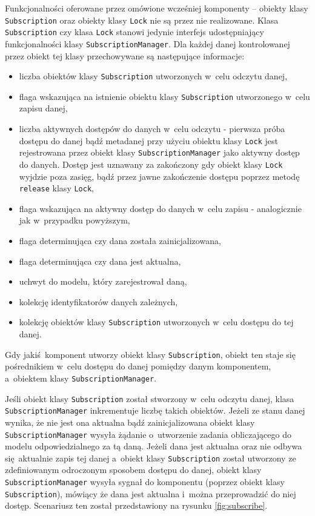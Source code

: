 Funkcjonalności oferowane przez omówione wcześniej komponenty -- obiekty klasy \lstinline$Subscription$ oraz obiekty klasy \lstinline$Lock$ nie są przez nie realizowane. Klasa \lstinline$Subscription$ czy klasa \lstinline$Lock$ stanowi jedynie interfejs udostępniający funkcjonalności klasy \lstinline$SubscriptionManager$. Dla każdej danej kontrolowanej przez obiekt tej klasy przechowywane są następujące informacje:
\begin{itemize}
	\item liczba obiektów klasy \lstinline$Subscription$ utworzonych w~celu odczytu danej,
	\item flaga wskazująca na istnienie obiektu klasy \lstinline$Subscription$ utworzonego w~celu zapisu danej,
	\item liczba aktywnych dostępów do danych w~celu odczytu - pierwsza próba dostępu do danej bądź metadanej przy użyciu obiektu klasy \lstinline$Lock$ jest rejestrowana przez obiekt klasy \lstinline$SubscriptionManager$ jako aktywny dostęp do danych. Dostęp jest uznawany za zakończony gdy obiekt klasy \lstinline$Lock$ wyjdzie poza zasięg, bądź przez jawne zakończenie dostępu poprzez metodę \lstinline$release$ klasy \lstinline$Lock$,
	\item flaga wskazująca na aktywny dostęp do danych w~celu zapisu - analogicznie jak w~przypadku powyższym,
	\item flaga determinująca czy dana została zainicjalizowana,
	\item flaga determinująca czy dana jest aktualna,
	\item uchwyt do modelu, który zarejestrował daną,
	\item kolekcję identyfikatorów danych zależnych,
	\item kolekcję obiektów klasy \lstinline$Subscription$ utworzonych w~celu dostępu do tej danej.
\end{itemize}

Gdy jakiś komponent utworzy obiekt klasy \lstinline$Subscription$, obiekt ten staje się pośrednikiem w~celu dostępu do danej pomiędzy danym komponentem, a~obiektem klasy \lstinline$SubscriptionManager$. 

Jeśli obiekt klasy \lstinline$Subscription$ został stworzony w~celu odczytu danej, klasa \lstinline$SubscriptionManager$ inkrementuje liczbę takich obiektów. Jeżeli ze stanu danej wynika, że nie jest ona aktualna bądź zainicjalizowana obiekt klasy \lstinline$SubscriptionManager$ wysyła żądanie o~utworzenie zadania obliczającego do modelu odpowiedzialnego za tą daną. Jeżeli dana jest aktualna oraz nie odbywa się aktualnie zapis tej danej a~obiekt klasy \lstinline$Subscription$ został utworzony ze zdefiniowanym odroczonym sposobem dostępu do danej, obiekt klasy \lstinline$SubscriptionManager$ wysyła sygnał do komponentu (poprzez obiekt klasy \lstinline$Subscription$), mówiący że dana jest aktualna i~można przeprowadzić do niej dostęp. Scenariusz ten został przedstawiony na rysunku \ref{fig:subscribe}.


